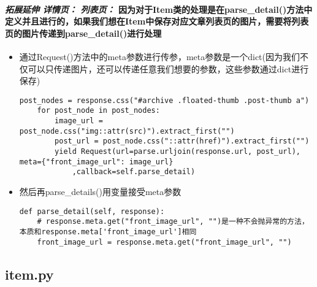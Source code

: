 \documentclass[11pt]{article}
\begin{document}
    \paragraph{\texorpdfstring{\emph{拓展延伸 详情页： 列表页： }
因为对于Item类的处理是在parse\_detail()方法中定义并且进行的，如果我们想在Item中保存对应文章列表页的图片，需要将列表页的图片传递到parse\_detail()进行处理}{拓展延伸 详情页： 列表页：  因为对于Item类的处理是在parse\_detail()方法中定义并且进行的，如果我们想在Item中保存对应文章列表页的图片，需要将列表页的图片传递到parse\_detail()进行处理}}\label{ux62d3ux5c55ux5ef6ux4f38-ux8be6ux60c5ux9875-ux5217ux8868ux9875-ux56e0ux4e3aux5bf9ux4e8eitemux7c7bux7684ux5904ux7406ux662fux5728parse_detailux65b9ux6cd5ux4e2dux5b9aux4e49ux5e76ux4e14ux8fdbux884cux7684ux5982ux679cux6211ux4eecux60f3ux5728itemux4e2dux4fddux5b58ux5bf9ux5e94ux6587ux7ae0ux5217ux8868ux9875ux7684ux56feux7247ux9700ux8981ux5c06ux5217ux8868ux9875ux7684ux56feux7247ux4f20ux9012ux5230parse_detailux8fdbux884cux5904ux7406}

\begin{itemize}
\item
  通过Request()方法中的meta参数进行传参，meta参数是一个dict(因为我们不仅可以只传递图片，还可以传递任意我们想要的参数，这些参数通过dict进行保存)

\begin{verbatim}
post_nodes = response.css("#archive .floated-thumb .post-thumb a")
    for post_node in post_nodes:
        image_url = post_node.css("img::attr(src)").extract_first("")
        post_url = post_node.css("::attr(href)").extract_first("")
        yield Request(url=parse.urljoin(response.url, post_url), meta={"front_image_url": image_url}
            ,callback=self.parse_detail)
\end{verbatim}
\item
  然后再parse\_details()用变量接受meta参数

\begin{verbatim}
def parse_detail(self, response):
    # response.meta.get("front_image_url", "")是一种不会抛异常的方法，本质和response.meta['front_image_url']相同
    front_image_url = response.meta.get("front_image_url", "")
\end{verbatim}
\end{itemize}

    \subsection{item.py}\label{item.py}
\end{document}
